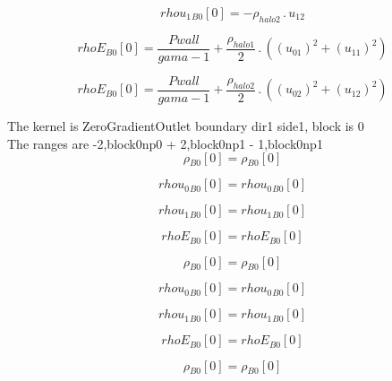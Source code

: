 \documentclass{article}
\begin{document}
\begin{dmath}{rhou_{1}{_{B0}}}[{0}] = - \rho_{halo 2} \,.\, u_{12}\end{dmath}

\begin{dmath}{rhoE{_{B0}}}[{0}] = \frac{Pwall}{gama - 1} + \frac{\rho_{halo 1}}{2} \,.\, \left(\left(u_{01} \right)^{2} + \left(u_{11} \right)^{2}\right)\end{dmath}

\begin{dmath}{rhoE{_{B0}}}[{0}] = \frac{Pwall}{gama - 1} + \frac{\rho_{halo 2}}{2} \,.\, \left(\left(u_{02} \right)^{2} + \left(u_{12} \right)^{2}\right)\end{dmath}

\noindent The kernel is ZeroGradientOutlet boundary dir1 side1, block is 0\\\noindent The ranges are -2,block0np0 + 2,block0np1 - 1,block0np1\\\begin{dmath}{\rho{_{B0}}}[{0}] = {\rho{_{B0}}}[{0}]\end{dmath}

\begin{dmath}{rhou_{0}{_{B0}}}[{0}] = {rhou_{0}{_{B0}}}[{0}]\end{dmath}

\begin{dmath}{rhou_{1}{_{B0}}}[{0}] = {rhou_{1}{_{B0}}}[{0}]\end{dmath}

\begin{dmath}{rhoE{_{B0}}}[{0}] = {rhoE{_{B0}}}[{0}]\end{dmath}

\begin{dmath}{\rho{_{B0}}}[{0}] = {\rho{_{B0}}}[{0}]\end{dmath}

\begin{dmath}{rhou_{0}{_{B0}}}[{0}] = {rhou_{0}{_{B0}}}[{0}]\end{dmath}

\begin{dmath}{rhou_{1}{_{B0}}}[{0}] = {rhou_{1}{_{B0}}}[{0}]\end{dmath}

\begin{dmath}{rhoE{_{B0}}}[{0}] = {rhoE{_{B0}}}[{0}]\end{dmath}

\begin{dmath}{\rho{_{B0}}}[{0}] = {\rho{_{B0}}}[{0}]\end{dmath}
\end{document}

